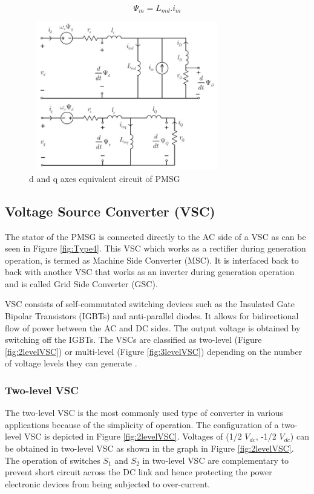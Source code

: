 \begin{equation}\label{Currentsource_MagFluxeq}
    \Psi_m = L_{md} . i_m
\end{equation}

\begin{figure}[H]
\centering
    \includegraphics[height = 6.5cm,width = 8.5cm]{Diagrams/Chapter_2/PMSG_equiv_ckt.png}
    \caption{d and q axes equivalent circuit of PMSG \cite{sebastian_transient_1989}}
    \label{fig:PMSG_equiv_ckt}
\end{figure}

\subsection{Voltage Source Converter (VSC)}\label{VSC_theory}
The stator of the \gls{PMSG} is connected directly to the \gls{AC} side of a \gls{VSC} as can be seen in Figure \ref{fig:Type4}. This \gls{VSC} which works as a rectifier during generation operation, is termed as Machine Side Converter (\gls{MSC}). It is interfaced back to back with another \gls{VSC} that works as an inverter during generation operation and is called Grid Side Converter (\gls{GSC}).

\gls{VSC} consists of self-commutated switching devices such as the Insulated Gate Bipolar Transistors (\gls{IGBT}s) and anti-parallel diodes. It allows for bidirectional flow of power between the \gls{AC} and \gls{DC} sides. The output voltage is obtained by switching off the \gls{IGBT}s. The \gls{VSC}s are classified as two-level (Figure \ref{fig:2levelVSC}) or multi-level (Figure \ref{fig:3levelVSC}) depending on the number of voltage levels they can generate \cite{noauthor_appendix_2014-1}. 

\subsubsection{Two-level VSC}
The two-level \gls{VSC} is the most commonly used type of converter in various applications because of the simplicity of operation. The configuration of a two-level \gls{VSC} is depicted in Figure \ref{fig:2levelVSC}. Voltages of (1/2 $V_{dc}$, -1/2 $V_{dc}$) can be obtained in two-level \gls{VSC} as shown in the graph in Figure \ref{fig:2levelVSC}. The operation of switches $S_{1}$ and $S_{2}$ in two-level \gls{VSC} are complementary to prevent short circuit across the \gls{DC} link and hence protecting the power electronic devices from being subjected to over-current.

